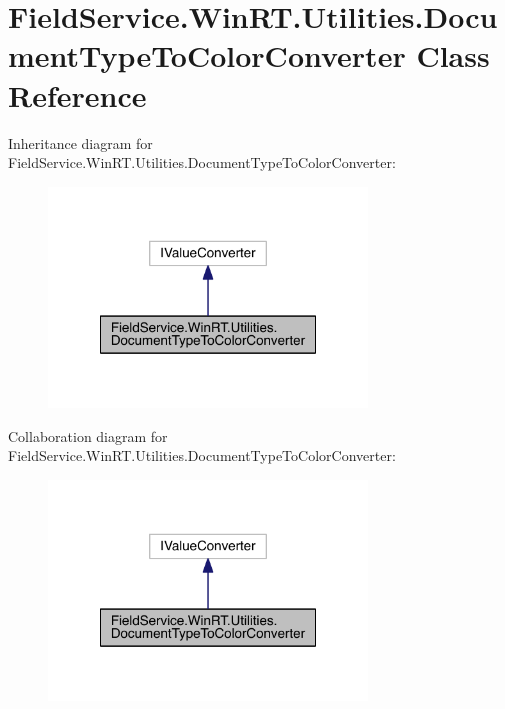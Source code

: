 \hypertarget{class_field_service_1_1_win_r_t_1_1_utilities_1_1_document_type_to_color_converter}{\section{Field\+Service.\+Win\+R\+T.\+Utilities.\+Document\+Type\+To\+Color\+Converter Class Reference}
\label{class_field_service_1_1_win_r_t_1_1_utilities_1_1_document_type_to_color_converter}
}


Inheritance diagram for Field\+Service.\+Win\+R\+T.\+Utilities.\+Document\+Type\+To\+Color\+Converter\+:
\nopagebreak
\begin{figure}[H]
\begin{center}
\leavevmode
\includegraphics[width=240pt]{class_field_service_1_1_win_r_t_1_1_utilities_1_1_document_type_to_color_converter__inherit__graph}
\end{center}
\end{figure}


Collaboration diagram for Field\+Service.\+Win\+R\+T.\+Utilities.\+Document\+Type\+To\+Color\+Converter\+:
\nopagebreak
\begin{figure}[H]
\begin{center}
\leavevmode
\includegraphics[width=240pt]{class_field_service_1_1_win_r_t_1_1_utilities_1_1_document_type_to_color_converter__coll__graph}
\end{center}
\end{figure}
